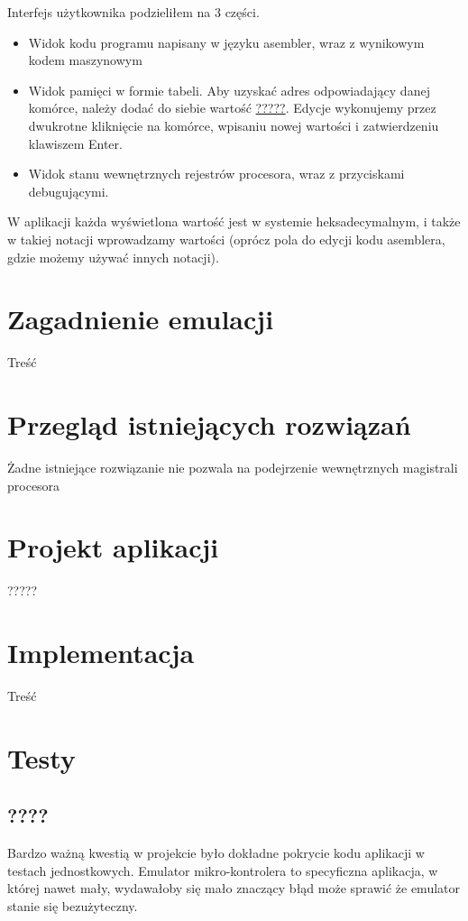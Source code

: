 \documentclass{article}
\begin{document}
	Interfejs użytkownika podzieliłem na 3 części. 
	\begin{itemize}  
		\item Widok kodu programu napisany w języku asembler, wraz z  wynikowym kodem maszynowym  
		\item Widok pamięci w formie tabeli. Aby uzyskać adres odpowiadający danej komórce, należy dodać do siebie wartość \underline{?????}. Edycje wykonujemy przez dwukrotne kliknięcie na komórce, wpisaniu nowej wartości i zatwierdzeniu klawiszem Enter.
		\item Widok stanu wewnętrznych rejestrów procesora, wraz z przyciskami debugującymi.   
	\end{itemize}
	
	W aplikacji każda wyświetlona wartość jest w systemie heksadecymalnym, i także w takiej notacji wprowadzamy wartości (oprócz pola do edycji kodu asemblera, gdzie możemy używać innych notacji).
	
	\section{Zagadnienie emulacji}
	Treść
	
	\section{Przegląd istniejących rozwiązań}
	Żadne istniejące rozwiązanie nie pozwala na podejrzenie wewnętrznych magistrali procesora
	
	\section{Projekt aplikacji}
	?????
	
	\section{Implementacja}
	Treść
	
	\section{Testy}
		
	\subsection{????}
	Bardzo ważną kwestią w projekcie było dokładne pokrycie kodu aplikacji w testach jednostkowych. Emulator mikro-kontrolera to specyficzna aplikacja, w której nawet mały, wydawałoby się mało znaczący błąd może sprawić że emulator stanie się bezużyteczny. 
	
\end{document}
